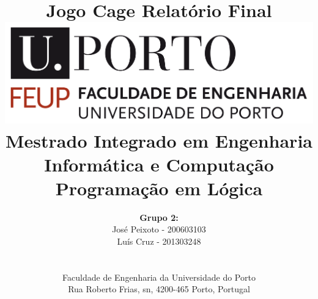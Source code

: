 \documentclass[a4paper]{article}
\begin{document}
\setlength{\textwidth}{16cm}
\setlength{\textheight}{22cm}

\title{\Huge\textbf{Jogo Cage}\linebreak\linebreak\linebreak
\Large\textbf{Relatório Final}\linebreak\linebreak
\linebreak\linebreak
\includegraphics[scale=0.1]{resources/feup-logo.png}\linebreak\linebreak
\linebreak\linebreak
\Large{Mestrado Integrado em Engenharia Informática e Computação} \linebreak\linebreak
\Large{Programação em Lógica}\linebreak
}

\author{\textbf{Grupo 2:}\\ José Peixoto - 200603103 \\ Luís Cruz - 201303248 \\\linebreak\linebreak \\
 \\ Faculdade de Engenharia da Universidade do Porto \\ Rua Roberto Frias, s\/n, 4200-465 Porto, Portugal \linebreak\linebreak\linebreak
\linebreak\linebreak\vspace{1cm}}
\maketitle
\thispagestyle{empty}
\end{document}
